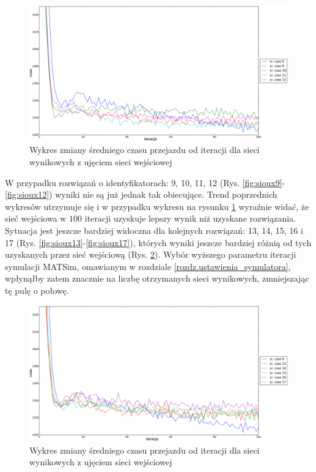 \documentclass[twoside,12pt]{report}
\begin{document}
\begin{figure}[htbp]
\centering
\includegraphics[width=1\textwidth]{img/iters/iters3}
\caption{Wykres zmiany średniego czasu przejazdu od iteracji dla sieci wynikowych z ujęciem sieci wejściowej}
\label{fig:iters3}
\end{figure}

W przypadku rozwiązań o identyfikatorach: 9, 10, 11, 12 (Rys. \ref{fig:sioux9}-\ref{fig:sioux12}) wyniki nie są już jednak tak obiecujące. Trend poprzednich wykresów utrzymuje się i w przypadku wykresu na rysunku \ref{fig:iters3} wyraźnie widać, że sieć wejściowa w $100$ iteracji uzyskuje lepszy wynik niż uzyskane rozwiązania. Sytuacja jest jeszcze bardziej widoczna dla kolejnych rozwiązań: 13, 14, 15, 16 i 17 (Rys. \ref{fig:sioux13}-\ref{fig:sioux17}), których wyniki jeszcze bardziej różnią od tych uzyskanych przez sieć wejściową (Rys. \ref{fig:iters4}). Wybór wyższego parametru iteracji symulacji MATSim, omawianym w rozdziale \ref{rozdz.ustawienia_symulatora}, wpłynąłby zatem znacznie  na liczbę otrzymanych sieci wynikowych, zmniejszając tę pulę o połowę.

\begin{figure}[htbp]
\centering
\includegraphics[width=1\textwidth]{img/iters/iters4}
\caption{Wykres zmiany średniego czasu przejazdu od iteracji dla sieci wynikowych z ujęciem sieci wejściowej}
\label{fig:iters4}
\end{figure}
\end{document}
